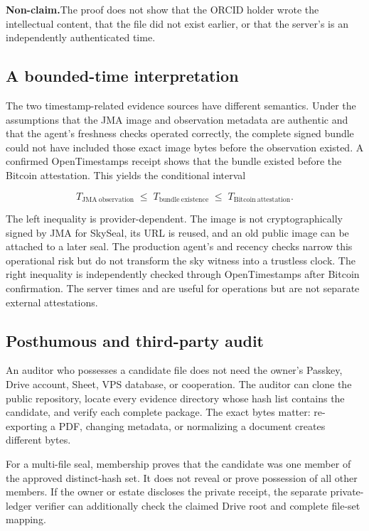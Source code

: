 \documentclass[11pt,a4paper]{article}
\newcommand{\code}[1]{\texttt{\detokenize{#1}}}
\newcommand{\nonclaim}{\textbf{Non-claim.}}
\begin{document}
\nonclaim The proof does not show that the ORCID holder wrote the intellectual content, that the file did not exist earlier, or that the server's \code{created_at} is an independently authenticated time.

\subsection{A bounded-time interpretation}

The two timestamp-related evidence sources have different semantics. Under the assumptions that the JMA image and observation metadata are authentic and that the agent's freshness checks operated correctly, the complete signed bundle could not have included those exact image bytes before the observation existed. A confirmed OpenTimestamps receipt shows that the bundle existed before the Bitcoin attestation. This yields the conditional interval

\begin{equation}
T_{\mathrm{JMA\ observation}}
\;\leq\;
T_{\mathrm{bundle\ existence}}
\;\leq\;
T_{\mathrm{Bitcoin\ attestation}}.
\label{eq:interval}
\end{equation}

The left inequality is provider-dependent. The image is not cryptographically signed by JMA for SkySeal, its URL is reused, and an old public image can be attached to a later seal. The production agent's \code{Last-Modified} and recency checks narrow this operational risk but do not transform the sky witness into a trustless clock. The right inequality is independently checked through OpenTimestamps after Bitcoin confirmation. The server times \code{retrieved_at} and \code{created_at} are useful for operations but are not separate external attestations.

\subsection{Posthumous and third-party audit}

An auditor who possesses a candidate file does not need the owner's Passkey, Drive account, Sheet, VPS database, or cooperation. The auditor can clone the public repository, locate every evidence directory whose hash list contains the candidate, and verify each complete package. The exact bytes matter: re-exporting a PDF, changing metadata, or normalizing a document creates different bytes.

For a multi-file seal, membership proves that the candidate was one member of the approved distinct-hash set. It does not reveal or prove possession of all other members. If the owner or estate discloses the private receipt, the separate private-ledger verifier can additionally check the claimed Drive root and complete file-set mapping.
\end{document}
